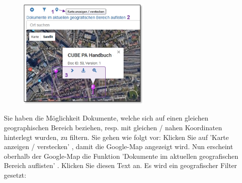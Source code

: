 \begin{figure}
  \vspace{-35pt}
  \begin{center}
    \includegraphics[height=55mm]{../chapters/11_Dokumentenablage/pictures/11-2-3_GeoBereichFilter.jpg}
  \end{center}
  \vspace{-20pt}
  \vspace{-10pt}
\end{figure}
Sie haben die Möglichkeit Dokumente, welche sich auf einen gleichen geographischen Bereich beziehen, resp. mit gleichen / nahen Koordinaten hinterlegt wurden, zu filtern. Sie gehen wie folgt vor: Klicken Sie auf 'Karte anzeigen / verstecken' , damit die Google-Map angezeigt wird. Nun erscheint oberhalb der Google-Map die Funktion 'Dokumente im aktuellen geografischen Bereich auflisten' . Klicken Sie diesen Text an. Es wird ein geografischer Filter gesetzt:

\vspace{1cm} 

